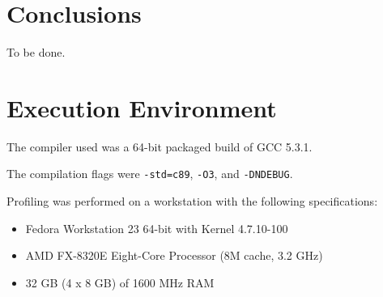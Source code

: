 \documentclass[12pt]{elsarticle}
\begin{document}
\section{Conclusions}

To be done.

\appendix

\section{Execution Environment} \label{ap:ENV}

The compiler used was a 64-bit packaged build of GCC 5.3.1.

The compilation flags were \texttt{-std=c89}, \texttt{-O3}, and
\texttt{-DNDEBUG}.

Profiling was performed on a workstation with the following specifications:
\begin{itemize}
    \item Fedora Workstation 23 64-bit with Kernel 4.7.10-100
    \item AMD FX-8320E Eight-Core Processor (8M cache, 3.2 GHz)
    \item 32 GB (4 x 8 GB) of 1600 MHz RAM
\end{itemize}
\end{document}
